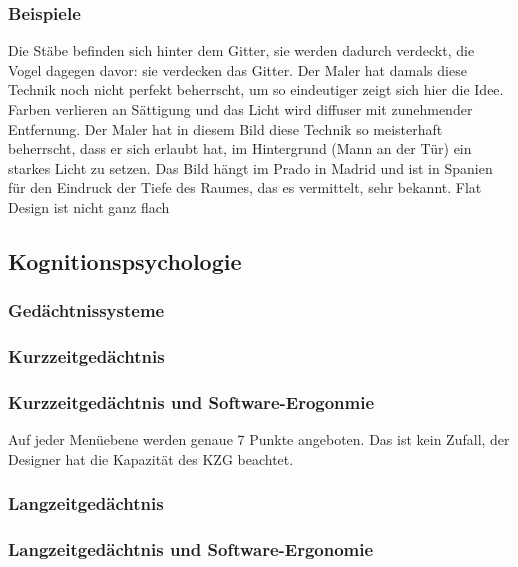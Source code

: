 \subsubsection*{Beispiele}
Die Stäbe befinden sich hinter dem Gitter, sie werden dadurch verdeckt, die Vogel dagegen davor: sie verdecken das Gitter. 
Der Maler hat damals diese Technik noch nicht perfekt beherrscht, um so eindeutiger zeigt sich hier die Idee.
Farben verlieren an Sättigung und das Licht wird diffuser mit zunehmender Entfernung. 
Der Maler hat in diesem Bild diese Technik so meisterhaft beherrscht, dass er sich erlaubt hat, im Hintergrund (Mann an der Tür) ein starkes Licht zu setzen. Das Bild hängt im Prado in Madrid und ist in Spanien für den Eindruck der Tiefe des Raumes, das es vermittelt, sehr bekannt.
Flat Design ist nicht ganz flach

\subsection{Kognitionspsychologie}
\subsubsection{Gedächtnissysteme}
\subsubsection*{Kurzzeitgedächtnis}
\subsubsection*{Kurzzeitgedächtnis und Software-Erogonmie}
Auf jeder Menüebene werden genaue 7 Punkte angeboten. Das ist kein Zufall, der Designer hat die Kapazität des KZG beachtet.
\subsubsection*{Langzeitgedächtnis}
\subsubsection*{Langzeitgedächtnis und Software-Ergonomie}

